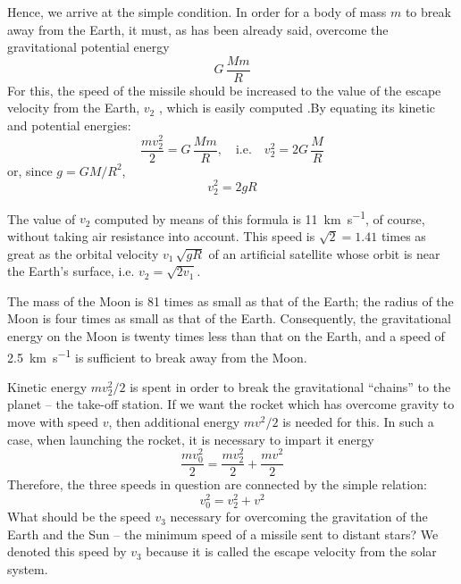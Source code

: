 Hence, we arrive at the simple condition. In order for
a body of mass $m$ to break away from the Earth, it must,
as has been already said, overcome the gravitational
potential energy
 \begin{equation*}%
G \, \dfrac{Mm}{R}
 \end{equation*}
For this, the speed of the missile should be increased
to the value of the escape velocity from the Earth, $v_{2}$ ,
which is easily computed .By equating its kinetic and
potential energies:
 \begin{equation*}%
\dfrac{mv_{2}^{2}}{2}  = G \, \dfrac{Mm}{R}, \quad \textrm{i.e.} \quad v_{2}^{2} = 2G \, \dfrac{M}{R}
 \end{equation*}
or, since $g = GM/R^{2}$,
 \begin{equation*}%
v_{2}^{2} = 2 gR 
 \end{equation*}

The value of $v_{2}$ computed by means of this formula is
\SI{11}{\kilo\meter\per\second}, of course, without taking air resistance into
account. This speed is $\sqrt{2} = 1.41$ times as great as the orbital velocity $v_{1} \, \sqrt{gR}$ of an artificial satellite whose orbit is near the Earth's surface, i.e. $v_{2} = \sqrt{2v_{1}}$.

The mass of the Moon is 81 times as small as that of
the Earth; the radius of the Moon is four times as small
as that of the Earth. Consequently, the gravitational
energy on the Moon is twenty times less than that on the
Earth, and a speed of \SI{2.5}{\kilo\meter\per\second} is sufficient to break away
from the Moon.

Kinetic energy $mv^{2}_{2}/2$ is spent in order to break the
gravitational ``chains'' to the planet -- the take-off station.
If we want the rocket which has overcome gravity to
move with speed $v$, then additional energy $mv^{2}/2$ is needed
for this. In such a case, when launching the rocket, it is
necessary to impart it energy 
 \begin{equation*}%
\dfrac{mv^{2}_{0}}{2} = \dfrac{mv^{2}_{2}}{2} + \dfrac{mv^{2}}{2}    
 \end{equation*}
Therefore, the three speeds in question are connected by
the simple relation:
 \begin{equation*}%
v_{0}^{2} = v_{2}^{2} + v^{2}
 \end{equation*}
What should be the speed $v_{3}$ necessary for overcoming
the gravitation of the Earth and the Sun -- the minimum
speed of a missile sent to distant stars? We denoted this
speed by $v_{3}$ because it is called the escape velocity from
the solar system.

